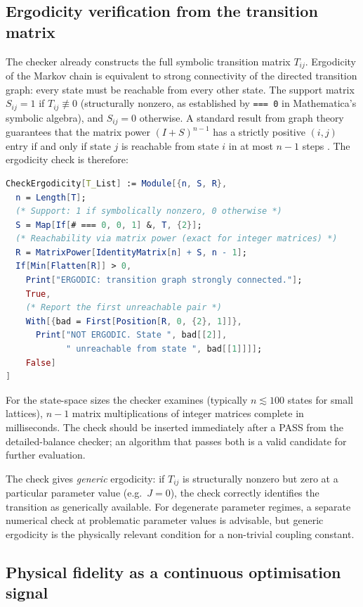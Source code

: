 \documentclass[10.5pt]{article}
\begin{document}
\subsection*{Ergodicity verification from the transition matrix}

The checker already constructs the full symbolic transition matrix
$T_{ij}$.  Ergodicity of the Markov chain is equivalent to strong
connectivity of the directed transition graph: every state must be
reachable from every other state.  The support matrix $S_{ij} = 1$ if
$T_{ij} \not\equiv 0$ (structurally nonzero, as established by
\texttt{=== 0} in Mathematica's symbolic algebra), and $S_{ij} = 0$
otherwise.  A standard result from graph theory guarantees that the
matrix power $(I + S)^{n-1}$ has a strictly positive $(i,j)$ entry if
and only if state $j$ is reachable from state $i$ in at most $n-1$
steps \cite{horn1985}.  The ergodicity check is therefore:

\begin{lstlisting}[language=Mathematica]
CheckErgodicity[T_List] := Module[{n, S, R},
  n = Length[T];
  (* Support: 1 if symbolically nonzero, 0 otherwise *)
  S = Map[If[# === 0, 0, 1] &, T, {2}];
  (* Reachability via matrix power (exact for integer matrices) *)
  R = MatrixPower[IdentityMatrix[n] + S, n - 1];
  If[Min[Flatten[R]] > 0,
    Print["ERGODIC: transition graph strongly connected."];
    True,
    (* Report the first unreachable pair *)
    With[{bad = First[Position[R, 0, {2}, 1]]},
      Print["NOT ERGODIC. State ", bad[[2]],
            " unreachable from state ", bad[[1]]]];
    False]
]
\end{lstlisting}

For the state-space sizes the checker examines (typically $n \lesssim
100$ states for small lattices), $n-1$ matrix multiplications of
integer matrices complete in milliseconds.  The check should be
inserted immediately after a PASS from the detailed-balance checker;
an algorithm that passes both is a valid candidate for further
evaluation.

The check gives \emph{generic} ergodicity: if $T_{ij}$ is structurally
nonzero but zero at a particular parameter value (e.g.\ $J = 0$),
the check correctly identifies the transition as generically available.
For degenerate parameter regimes, a separate numerical check at
problematic parameter values is advisable, but generic ergodicity is
the physically relevant condition for a non-trivial coupling constant.

\subsection*{Physical fidelity as a continuous optimisation signal}
\end{document}
